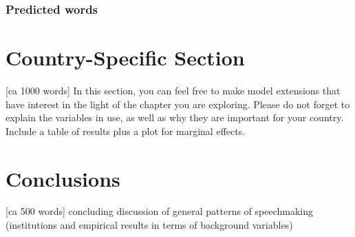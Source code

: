 \documentclass[letter,12pt]{article}
\begin{document}

    \subsubsection{Predicted words}


  
\section{Country-Specific Section} [ca 1000 words]
In this section, you can feel free to make model extensions that have interest in the light of the chapter you are exploring. Please do not forget to explain the variables in use, as well as why they are important for your country. Include a table of results plus a plot for marginal effects. 

\section{Conclusions} [ca 500 words]
concluding discussion of general patterns of speechmaking (institutions and empirical results in terms of background variables)
\end{document}
